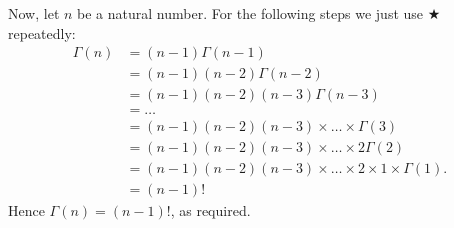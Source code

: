 \noindent Now, let $n$ be a natural number. For the following steps we just use $\bigstar$ repeatedly:
\begin{align*}
\Gamma(n) & = (n-1)\Gamma(n-1)  \tag{by $\bigstar$} \\
	& = (n-1)(n-2)\Gamma(n-2) \tag{as $\Gamma(n-1) = (n-2)\Gamma(n-2)$} \\
	& = (n-1)(n-2)(n-3)\Gamma(n-3)  \tag{as $\Gamma(n-2) = (n-3)\Gamma(n-3)$}\\
	& = \ldots \tag{continue applying $\bigstar$ repeatedly} \\
	& = (n-1)(n-2)(n-3)\times\ldots\times\Gamma(3) \\
	& = (n-1)(n-2)(n-3)\times\ldots\times2\Gamma(2) \tag{as $\Gamma(3) = 2\Gamma(2)$} \\
	& = (n-1)(n-2)(n-3)\times\ldots\times2\times1\times\Gamma(1). \tag{as $\Gamma(2) = 1\Gamma(1)$} \\
	& = (n-1)!  \tag{as $\Gamma(1) = 1$}
\end{align*}
Hence $\Gamma(n) = (n-1)!$, as required.

